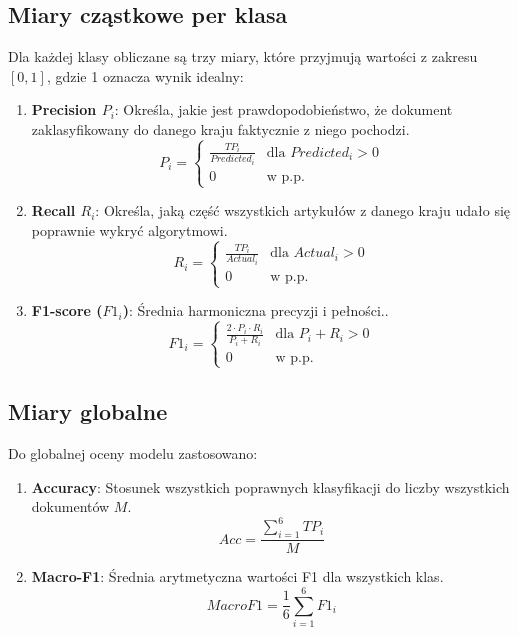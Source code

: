 \documentclass{article}
\begin{document}
	\subsection{Miary cząstkowe per klasa}
	Dla każdej klasy obliczane są trzy miary, które przyjmują wartości z zakresu $[0, 1]$, gdzie 1 oznacza wynik idealny:
	\begin{enumerate}
		\item \textbf{Precision $P_i$}: Określa, jakie jest prawdopodobieństwo, że dokument zaklasyfikowany do danego kraju faktycznie z niego pochodzi.
		\begin{equation}
			P_i =
			\begin{cases} 
				\frac{TP_i}{Predicted_i} & \text{dla } Predicted_i > 0 \\
				0 & \text{w p.p.} 
			\end{cases}
		\end{equation}
		\item \textbf{Recall $R_i$}: Określa, jaką część wszystkich artykułów z danego kraju udało się poprawnie wykryć algorytmowi.
		\begin{equation}
			R_i =
			\begin{cases}
				\frac{TP_i}{Actual_i} & \text{dla } Actual_i > 0 \\
				0 & \text{w p.p.}
			\end{cases}
		\end{equation}
		\item \textbf{F1-score ($F1_i$)}: Średnia harmoniczna precyzji i pełności..
		\begin{equation}
			F1_i =
			\begin{cases}
				\frac{2 \cdot P_i \cdot R_i}{P_i + R_i} & \text{dla } P_i + R_i > 0 \\
				0 & \text{w p.p.}
			\end{cases}
		\end{equation}
	\end{enumerate}
	
	\subsection{Miary globalne}
	Do globalnej oceny modelu zastosowano:
	\begin{enumerate}
		\item \textbf{Accuracy}: Stosunek wszystkich poprawnych klasyfikacji do liczby wszystkich dokumentów \(M\).
		\begin{equation}
			Acc = \frac{\sum_{i=1}^{6} TP_i}{M}
		\end{equation}
		\item \textbf{Macro-F1}: Średnia arytmetyczna wartości F1 dla wszystkich klas.
		\begin{equation}
			MacroF1 = \frac{1}{6} \sum_{i=1}^{6} F1_i
		\end{equation}
	\end{enumerate}
	
\end{document}
